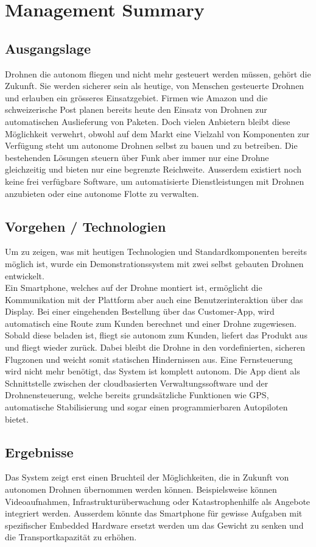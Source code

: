 \newpage
{}
\chapter*{Management Summary}
\section*{Ausgangslage}
Drohnen die autonom fliegen und nicht mehr gesteuert werden müssen, gehört die Zukunft. Sie werden sicherer sein als heutige, von Menschen gesteuerte Drohnen und erlauben ein grösseres Einsatzgebiet. Firmen wie Amazon und die schweizerische Post planen bereits heute den Einsatz von Drohnen zur automatischen Auslieferung von Paketen. Doch vielen Anbietern bleibt diese Möglichkeit verwehrt, obwohl auf dem Markt eine Vielzahl von Komponenten zur Verfügung steht um autonome Drohnen selbst zu bauen und zu betreiben. Die bestehenden Lösungen steuern über Funk aber immer nur eine Drohne gleichzeitig und bieten nur eine begrenzte Reichweite. Ausserdem existiert noch keine frei verfügbare Software, um automatisierte Dienstleistungen mit Drohnen anzubieten oder eine autonome Flotte zu verwalten.

\section*{Vorgehen / Technologien}
Um zu zeigen, was mit heutigen Technologien und Standardkomponenten bereits möglich ist, wurde ein Demonstrationssystem mit zwei selbst gebauten Drohnen entwickelt. \\

Ein Smartphone, welches auf der Drohne montiert ist, ermöglicht die Kommunikation mit der Plattform aber auch eine Benutzerinteraktion über das Display. Bei einer eingehenden Bestellung über das Customer-App, wird automatisch eine Route zum Kunden berechnet und einer Drohne zugewiesen. Sobald diese beladen ist, fliegt sie autonom zum Kunden, liefert das Produkt aus und fliegt wieder zurück. Dabei bleibt die Drohne in den vordefinierten, sicheren Flugzonen und weicht somit statischen Hindernissen aus. Eine Fernsteuerung wird nicht mehr benötigt, das System ist komplett autonom. Die App dient als Schnittstelle zwischen der cloudbasierten Verwaltungssoftware und der Drohnensteuerung, welche bereits grundsätzliche Funktionen wie GPS, automatische Stabilisierung und sogar einen programmierbaren Autopiloten bietet.

\section*{Ergebnisse}
Das System zeigt erst einen Bruchteil der Möglichkeiten, die in Zukunft von autonomen Drohnen übernommen werden können. Beispielsweise können Videoaufnahmen, Infrastrukturüberwachung oder Katastrophenhilfe als Angebote integriert werden. Ausserdem könnte das Smartphone für gewisse Aufgaben mit spezifischer Embedded Hardware ersetzt werden um das Gewicht zu senken und die Transportkapazität zu erhöhen. \\

